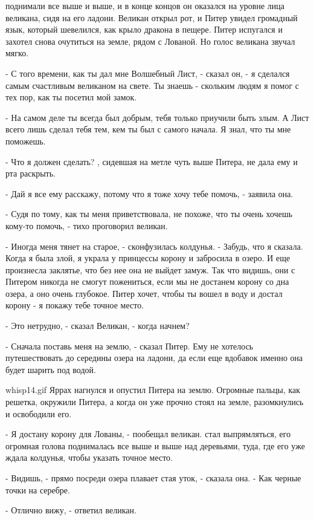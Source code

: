 поднимали все выше и выше, и в конце концов он оказался на уровне лица 
великана, сидя на его ладони. Великан открыл рот, и Питер увидел 
громадный язык, который шевелился, как крыло дракона в пещере. Питер 
испугался и захотел снова очутиться на земле, рядом с Лованой. Но 
голос великана звучал мягко.
\par- С того времени, как ты дал мне Волшебный Лист, - сказал он, - я 
сделался самым счастливым великаном на свете. Ты знаешь - скольким 
людям я помог с тех пор, как ты посетил мой замок.
\par- На самом деле ты всегда был добрым, тебя только приучили быть 
злым. А Лист всего лишь сделал тебя тем, кем ты был с самого начала. Я 
знал, что ты мне поможешь.
\par- Что я должен сделать?
, сидевшая на метле чуть выше Питера, не дала ему и рта 
раскрыть.
\par- Дай я все ему расскажу, потому что я тоже хочу тебе помочь, - 
заявила она.
\par- Судя по тому, как ты меня приветствовала, не похоже, что ты 
очень хочешь кому-то помочь, - тихо проговорил великан.
\par- Иногда меня тянет на старое, - сконфузилась колдунья. - Забудь, 
что я сказала. Когда я была злой, я украла у принцессы корону и 
забросила в озеро. И еще произнесла заклятье, что без нее она не 
выйдет замуж. Так что видишь, они с Питером никогда не смогут 
пожениться, если мы не достанем корону со дна озера, а оно очень 
глубокое. Питер хочет, чтобы ты вошел в воду и достал корону - я 
покажу тебе точное место.
\par- Это нетрудно, - сказал Великан, - когда начнем?
\par- Сначала поставь меня на землю, - сказал Питер. Ему не хотелось 
путешествовать до середины озера на ладони, да если еще вдобавок 
именно она будет шарить под водой.
\par{whisp14.gif}
 Яррах нагнулся и опустил Питера на землю. Огромные пальцы, 
как решетка, окружили Питера, а когда он уже прочно стоял на земле, 
разомкнулись и освободили его.
\par- Я достану корону для Лованы, - пообещал великан.
 стал выпрямляться, его огромная голова поднималась все выше 
и выше над деревьями, туда, где его уже ждала колдунья, чтобы указать 
точное место.
\par- Видишь, - прямо посреди озера плавает стая уток, - сказала она. 
- Как черные точки на серебре.
\par- Отлично вижу, - ответил великан.
